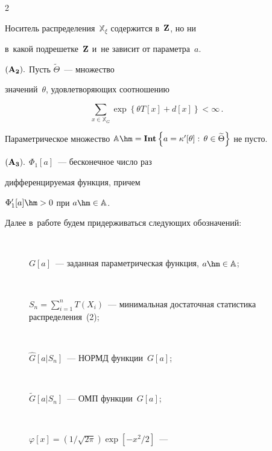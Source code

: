 \begin{multicols}{2}
\begin{description}
   Носитель распределения~${\mathbb X}_\xi$ содержится в~$\bf Z$, но ни 


   в~какой подрешетке~$\bf Z$ и~не зависит от параметра~$a$.


  \item[\,] $\bf (A_2).$ Пусть $\widetilde{\Theta}$~--- множество 


  значений~$\theta$, удовлетворяющих соотношению


  \begin{equation*}


   \sum\limits_{x\in {\mathbb X}_G} \exp \left\{\theta  T[x]+d[x]\right\}<\infty\,.


  \end{equation*}


   Параметрическое множество ${\mathbb A}\hm= \mathbf{Int} 


   \left\{a=\kappa'[\theta]:\,\theta\in\widetilde{\Theta}\right\}$ не пусто.


  \item[\,] $\bf (A_3).$ $\Phi_1[a]$~--- бесконечное число раз 


  дифференцируемая функция, причем


      $\Phi'_1[a]\hm > 0$ при $a\hm\in {\mathbb A}$.


  \end{description}





  Далее в~работе будем придерживаться сле\-ду\-ющих обозначений:


  \begin{description}


\item[\,] $G[a]$~--- заданная параметрическая функция, $a\hm\in {\mathbb A}$;


\item[\,]


 $S_n=\sum\limits_{i=1}^n T(X_i)$~--- минимальная достаточная статистика распределения~(2);


 \item[\,]


 $\widehat{G}[a|S_n]$~--- НОРМД функции~$G[a]$;


\item[\,]


 $\widetilde{G}[a|S_n]$~--- ОМП функции~$G[a]$;


\item[\,]


 $\varphi[x]=({1}/{\sqrt{2\pi}})\exp\left[-x^2/2\right]$~--- 



\end{description}
\end{multicols}
